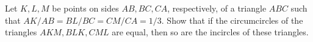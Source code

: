 Let $K,L,M$ be points on sides $AB,BC,CA$, respectively, of a triangle $ABC$ such that $AK/AB = BL/BC = CM/CA = 1/3$. Show that if the circumcircles of the triangles $AKM, BLK, CML$ are equal, then so are the incircles of these triangles.